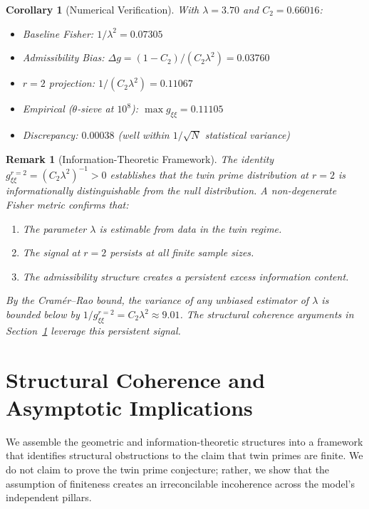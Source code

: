 \documentclass[12pt]{article}
\newtheorem{corollary}[theorem]{Corollary}
\newtheorem{remark}[theorem]{Remark}
\begin{document}
\begin{corollary}[Numerical Verification]
With $\lambda = 3.70$ and $C_2 = 0.66016$:
\begin{itemize}
  \item Baseline Fisher: $1/\lambda^2 = 0.07305$
  \item Admissibility Bias: $\Delta g = (1-C_2)/(C_2\lambda^2) = 0.03760$
  \item $r=2$ projection: $1/(C_2\lambda^2) = 0.11067$
  \item Empirical ($\theta$-sieve at $10^8$): $\max g_{\xi\xi} = 0.11105$
  \item Discrepancy: $0.00038$ (well within $1/\sqrt{N}$ statistical variance)
\end{itemize}
\end{corollary}

\begin{remark}[Information-Theoretic Framework]
The identity $g_{\xi\xi}^{r=2} = (C_2\lambda^2)^{-1} > 0$ establishes that the
twin prime distribution at $r=2$ is \textit{informationally distinguishable}
from the null distribution. A non-degenerate Fisher metric confirms that:
\begin{enumerate}
  \item The parameter $\lambda$ is estimable from data in the twin regime.
  \item The signal at $r=2$ persists at all finite sample sizes.
  \item The admissibility structure creates a persistent excess information content.
\end{enumerate}
By the Cram\'er--Rao bound, the variance of any unbiased estimator of $\lambda$
is bounded below by $1/g_{\xi\xi}^{r=2} = C_2\lambda^2 \approx 9.01$. The
structural coherence arguments in Section~\ref{sec:asymptotic_coherence}
leverage this persistent signal.
\end{remark}

\section{Structural Coherence and Asymptotic Implications}
\label{sec:asymptotic_coherence}

We assemble the geometric and information-theoretic structures into a framework
that identifies structural obstructions to the claim that twin primes are finite.
We do not claim to prove the twin prime conjecture; rather, we show that the
assumption of finiteness creates an irreconcilable incoherence across the model's
independent pillars.
\end{document}
